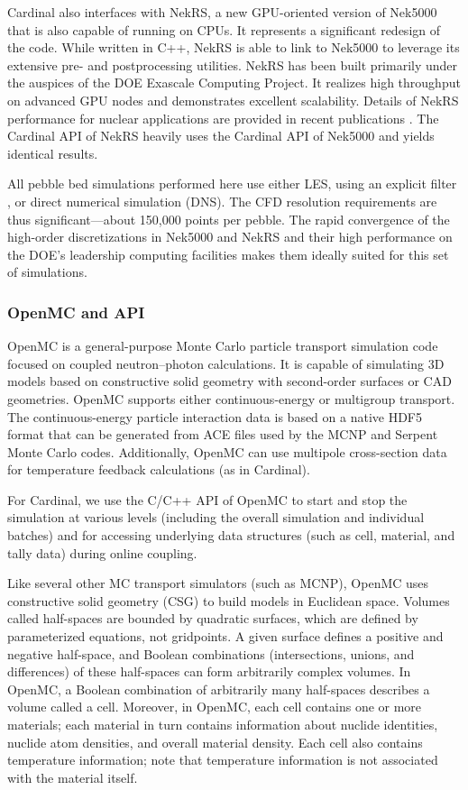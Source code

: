 Cardinal also interfaces with NekRS, a new GPU-oriented version of Nek5000
that is also capable of running on CPUs. It represents a significant redesign
of the code.  While written in C++, NekRS is able to link to Nek5000 to
leverage its extensive pre- and postprocessing utilities.  NekRS has been
built primarily under the auspices of the DOE Exascale Computing Project. It
realizes high throughput on advanced GPU nodes and demonstrates excellent
scalability.  Details of NekRS performance for nuclear applications are
provided in recent publications \cite{merzari2020toward}. The Cardinal API of
NekRS heavily uses the Cardinal API of Nek5000 and yields identical results.

All pebble bed simulations performed here use either LES, using an explicit
filter \cite{fischer2001filter}, or direct numerical simulation (DNS). The CFD
resolution requirements are thus significant---about 150,000 points per pebble.
The rapid convergence of the high-order discretizations in Nek5000 and NekRS
and their high performance on the DOE's leadership computing facilities makes
them ideally suited for this set of simulations.

\subsubsection{OpenMC and API}

OpenMC \cite{romano2015openmc} is a general-purpose Monte Carlo particle transport simulation code focused on coupled neutron--photon calculations. It is
capable of simulating 3D models based on constructive solid geometry with second-order surfaces or CAD geometries. OpenMC
supports either continuous-energy or multigroup transport. The continuous-energy particle interaction data
is based on a native HDF5 format that can be generated from ACE files used by the MCNP and Serpent
Monte Carlo codes. Additionally, OpenMC can use multipole cross-section data for temperature feedback
calculations (as in Cardinal).

For Cardinal, we use the C/C++ API of OpenMC to start and stop the simulation at various levels (including the overall
simulation and individual batches) and for accessing underlying data structures (such as cell, material, and
tally data) during online coupling.

Like several other MC transport simulators (such as MCNP), OpenMC uses constructive solid geometry (CSG) to build models in Euclidean space.
Volumes called half-spaces are bounded by quadratic surfaces, which are defined by parameterized equations, not gridpoints. A given surface defines a positive and negative half-space, and Boolean combinations (intersections, unions, and differences) of these half-spaces can form arbitrarily complex volumes. In OpenMC, a Boolean combination of arbitrarily many half-spaces describes a volume called a cell. Moreover, in OpenMC, each cell contains one or more materials; each material in turn contains information about nuclide identities, nuclide atom densities, and overall material density. Each cell also contains temperature information; note that temperature information is not associated with the material itself.

